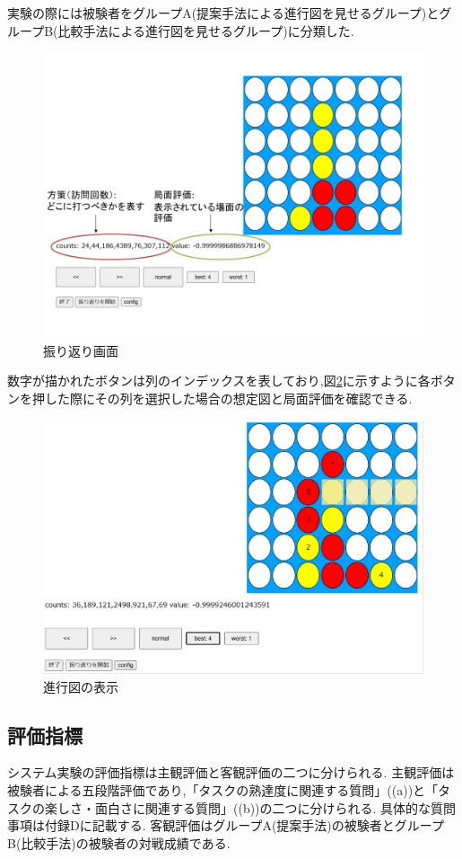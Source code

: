 実験の際には被験者をグループA(提案手法による進行図を見せるグループ)とグループB(比較手法による進行図を見せるグループ)に分類した.
\begin{figure}[t]
	\centering
	\includegraphics[width=\linewidth]{./figure/lookBack.png}
	\caption{振り返り画面}
	\label{fig:lookBack}
\end{figure}
数字が描かれたボタンは列のインデックスを表しており,図\ref{fig:trajSystem}に示すように各ボタンを押した際にその列を選択した場合の想定図と局面評価を確認できる.
\begin{figure}[t]
    \centering
    \includegraphics[width=\linewidth]{./figure/trajSystem.pdf}
	\caption{進行図の表示}
	\label{fig:trajSystem}
\end{figure}
\subsection{評価指標}
システム実験の評価指標は主観評価と客観評価の二つに分けられる.
主観評価は被験者による五段階評価であり,「タスクの熟達度に関連する質問」((a))と「タスクの楽しさ・面白さに関連する質問」((b))の二つに分けられる.
具体的な質問事項は付録Dに記載する.
客観評価はグループA(提案手法)の被験者とグループB(比較手法)の被験者の対戦成績である.


